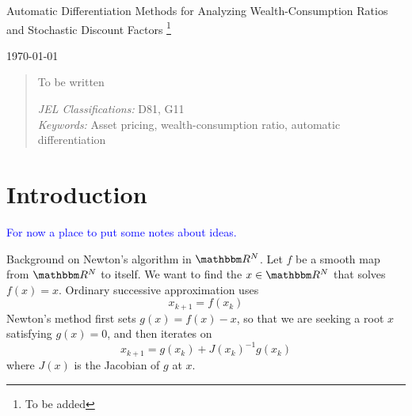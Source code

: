 \documentclass[12pt, reqno]{amsart}
\newcommand\blfootnote[1]{%
  \begingroup
  \renewcommand\thefootnote{}\footnote{#1}%
  \addtocounter{footnote}{-1}%
  \endgroup
}
\newcommand{\1}{\mathbbm 1}
\newcommand{\RR}{\mathbbm R}
\theoremstyle{plain}
\theoremstyle{definition}
\begin{document}
\title{}




\begin{center}
    \LARGE 
    Automatic Differentiation Methods for Analyzing Wealth-Consumption Ratios
    and Stochastic Discount Factors\blfootnote{To be added}
 
    \vspace{1em}



    \normalsize
    \today
\end{center}


\begin{abstract}
    To be written
    \vspace{1em}

    \noindent
    \textit{JEL Classifications:} D81, G11 \\
    \textit{Keywords:} Asset pricing, wealth-consumption ratio, automatic differentiation
\end{abstract}





\maketitle


\section{Introduction}

\textcolor{blue}{For now a place to put some notes about ideas.}

Background on Newton's algorithm in $\RR^N$.  Let $f$ be a smooth map from
$\RR^N$ to itself.  We want to find the $x \in \RR^N$ that solves $f(x)=x$.
Ordinary successive approximation uses
%
\begin{equation}
    x_{k+1} = f(x_k)
\end{equation}
%
Newton's method first sets $g(x) = f(x) -x$, so that we are seeking a root $x$
satisfying $g(x)=0$, and then iterates on
%
\begin{equation}
    x_{k+1} = g(x_k) + J(x_k)^{-1} g(x_k)
\end{equation}
%
where $J(x)$ is the Jacobian of $g$ at $x$.
\end{document}
